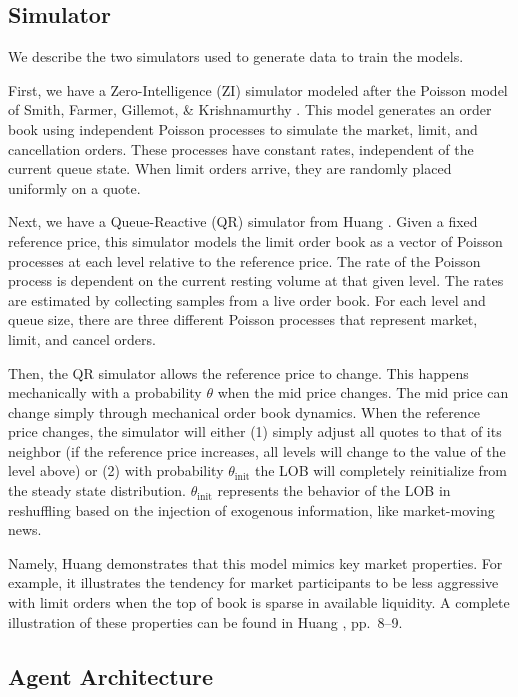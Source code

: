 \documentclass{article}
\begin{document}
\subsection{Simulator}
\label{sec:simulator}

We describe the two simulators used to generate data to train the models.

First, we have a Zero-Intelligence (ZI) simulator modeled after the Poisson model of Smith, Farmer, Gillemot, \& Krishnamurthy \citep{smith2003}. This model generates an order book using independent Poisson processes to simulate the market, limit, and cancellation orders. These processes have constant rates, independent of the current queue state. When limit orders arrive, they are randomly placed uniformly on a quote.

Next, we have a Queue-Reactive (QR) simulator from Huang \citep{huang2015}. Given a fixed reference price, this simulator models the limit order book as a vector of Poisson processes at each level relative to the reference price. The rate of the Poisson process is dependent on the current resting volume at that given level. The rates are estimated by collecting samples from a live order book. For each level and queue size, there are three different Poisson processes that represent market, limit, and cancel orders.

Then, the QR simulator allows the reference price to change. This happens mechanically with a probability $\theta$ when the mid price changes. The mid price can change simply through mechanical order book dynamics. When the reference price changes, the simulator will either (1) simply adjust all quotes to that of its neighbor (if the reference price increases, all levels will change to the value of the level above) or (2) with probability $\theta_{\text{init}}$ the LOB will completely reinitialize from the steady state distribution. $\theta_{\text{init}}$ represents the behavior of the LOB in reshuffling based on the injection of exogenous information, like market-moving news.

Namely, Huang demonstrates that this model mimics key market properties. For example, it illustrates the tendency for market participants to be less aggressive with limit orders when the top of book is sparse in available liquidity. A complete illustration of these properties can be found in Huang \citep{huang2015}, pp.\ 8--9.

\subsection{Agent Architecture}
\end{document}
